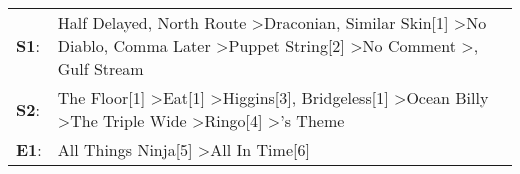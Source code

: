 \begin{supertabular}{p{0.03\textwidth}p{0.92\textwidth}}
 \textbf{S1}:  &  Half Delayed\textsuperscript{}, \enspace North Route\textsuperscript{} \textgreater \enspace Draconian\textsuperscript{}, \enspace Similar Skin[1]\textsuperscript{} \textgreater \enspace No Diablo\textsuperscript{}, \enspace Comma Later\textsuperscript{} \textgreater \enspace Puppet String[2]\textsuperscript{} \textgreater \enspace No Comment\textsuperscript{} \textgreater {}\textsuperscript{}, \enspace Gulf Stream\textsuperscript{}  \enspace  \\
 \textbf{S2}:  &                                                                       The Floor[1]\textsuperscript{} \textgreater \enspace Eat[1]\textsuperscript{} \textgreater \enspace Higgins[3]\textsuperscript{}, \enspace Bridgeless[1]\textsuperscript{} \textgreater \enspace Ocean Billy\textsuperscript{} \textgreater \enspace The Triple Wide\textsuperscript{} \textgreater \enspace Ringo[4]\textsuperscript{} \textgreater {}'s Theme\textsuperscript{}  \enspace  \\
 \textbf{E1}:  &                                                                                                                                                                                                                                                                                                                                                                     All Things Ninja[5]\textsuperscript{} \textgreater \enspace All In Time[6]\textsuperscript{}  \enspace  \\
\end{supertabular}
